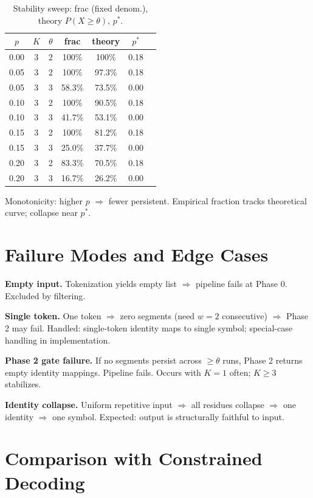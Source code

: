 \begin{table}[t]
\centering
\caption{Stability sweep: frac (fixed denom.), theory $P(X \geq \theta)$, $p^*$.}
\label{tab:stability_full}
\small
\begin{tabular}{ccccccc}
\toprule
\textbf{$p$} & \textbf{$K$} & \textbf{$\theta$} & \textbf{frac} & \textbf{theory} & \textbf{$p^*$} \\
\midrule
0.00 & 3 & 2 & 100\% & 100\% & 0.18 \\
0.05 & 3 & 2 & 100\% & 97.3\% & 0.18 \\
0.05 & 3 & 3 & 58.3\% & 73.5\% & 0.00 \\
0.10 & 3 & 2 & 100\% & 90.5\% & 0.18 \\
0.10 & 3 & 3 & 41.7\% & 53.1\% & 0.00 \\
0.15 & 3 & 2 & 100\% & 81.2\% & 0.18 \\
0.15 & 3 & 3 & 25.0\% & 37.7\% & 0.00 \\
0.20 & 3 & 2 & 83.3\% & 70.5\% & 0.18 \\
0.20 & 3 & 3 & 16.7\% & 26.2\% & 0.00 \\
\bottomrule
\end{tabular}
\end{table}

Monotonicity: higher $p$ $\Rightarrow$ fewer persistent. Empirical fraction tracks theoretical curve; collapse near $p^*$.

\section{Failure Modes and Edge Cases}
\label{app:failures}

\textbf{Empty input.}
Tokenization yields empty list $\Rightarrow$ pipeline fails at Phase 0. Excluded by filtering.

\textbf{Single token.}
One token $\Rightarrow$ zero segments (need $w=2$ consecutive) $\Rightarrow$ Phase 2 may fail. Handled: single-token identity maps to single symbol; special-case handling in implementation.

\textbf{Phase 2 gate failure.}
If no segments persist across $\geq \theta$ runs, Phase 2 returns empty identity mappings. Pipeline fails. Occurs with $K=1$ often; $K \geq 3$ stabilizes.

\textbf{Identity collapse.}
Uniform repetitive input $\Rightarrow$ all residues collapse $\Rightarrow$ one identity $\Rightarrow$ one symbol. Expected: output is structurally faithful to input.

\section{Comparison with Constrained Decoding}
\label{app:constrained}


